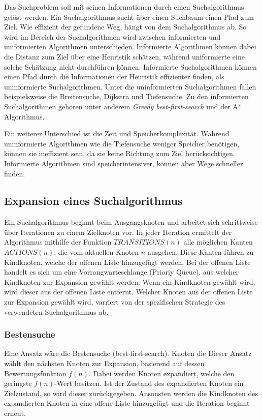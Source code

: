 Das Suchproblem soll mit seinen Informationen durch einen Suchalgorithmus gelöst werden. Ein Suchalgorithmus sucht über einen Suchbaum einen Pfad zum Ziel. Wie effizient der gefundene Weg, hängt von dem Suchalgorithmus ab. So wird im Bereich der Suchalgorithmen wird zwischen informierten und uniformierten Algorithmen unterschieden. Informierte Algorithmen können dabei die Distanz zum Ziel über eine Heuristik schätzen, während uniformierte eine solche Schätzung nicht durchführen können. Informierte Suchalgorithmen können einen Pfad durch die Informationen der Heuristik effizienter finden, als uninformierte Suchalgorithmen. Unter die uninformierten Suchalgorithmen fallen beispielsweise die Breitensuche, Dijkstra und Tiefensuche. Zu den informierten Suchalgorithmen gehören unter anderem \textit{Greedy best-first-search} und der A* Algorithmus.

Ein weiterer Unterschied ist die Zeit und Speicherkomplexität. Während uninformierte Algorithmen wie die Tiefensuche weniger Speicher benötigen, können sie ineffizient sein, da sie keine Richtung zum Ziel berücksichtigen. Informierte Algorithmen sind speicherintensiver, können aber Wege schneller finden.


\subsection{Expansion eines Suchalgorithmus}

Ein Suchalgorithmus beginnt beim Ausgangsknoten und arbeitet sich schrittweise über Iterationen zu einem Zielknoten vor. In jeder Iteration ermittelt der Algorithmus mithilfe der Funktion $TRANSITIONS(n)$ alle möglichen Kanten $ACTIONS(n)$, die vom aktuellen Knoten $n$ ausgehen. Diese Kanten führen zu Kindknoten, welche der offenen Liste hinzugefügt werden. Bei der offenen Liste handelt es sich um eine Vorrangwarteschlange (Prioriy Queue), aus welcher Kindknoten zur Expansion gewählt werden. Wenn ein Kindknoten gewählt wird, wird dieser aus der offenen Liste entfernt. Welcher Knoten aus der offenen Liste zur Expansion gewählt wird, varriert von der spezifischen Strategie des verwendeten Suchalgorithmus ab.

\subsubsection{Bestensuche}

Eine Ansatz wäre die Bestensuche (best-first-search). Knoten die Dieser Ansatz wählt den nächsten Knoten zur Expansion, basierend auf dessen Bewertungsfunktion $f(n)$. Dabei werden Knoten expandiert, welche den geringste $f(n)$-Wert besitzen. Ist der Zustand des expandierten Knoten ein Zielzustand, so wird dieser zurückgegeben. Ansonsten werden die Kindknoten des expandierten Knoten in eine offene-Liste hinzugefügt und die Iteration beginnt erneut.


